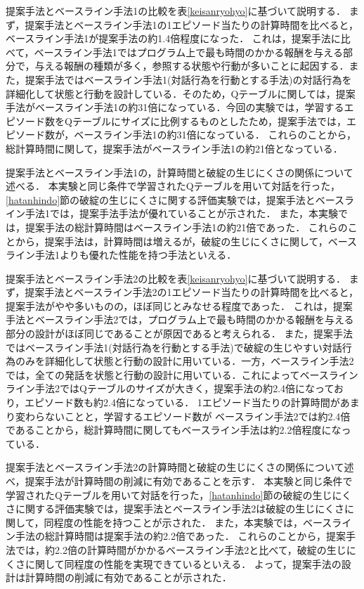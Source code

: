 \documentclass[12pt,a4paper,twoside,openany]{jbook}
\begin{document}
提案手法とベースライン手法1の比較を表\ref{keisanryohyo}に基づいて説明する．
まず，提案手法とベースライン手法1の1エピソード当たりの計算時間を比べると，ベースライン手法1が提案手法の約1.4倍程度になった．
これは，提案手法に比べて，ベースライン手法1ではプログラム上で最も時間のかかる報酬を与える部分で，与える報酬の種類が多く，参照する状態や行動が多いことに起因する．また，提案手法ではベースライン手法1(対話行為を行動とする手法)の対話行為を詳細化して状態と行動を設計している．そのため，Qテーブルに関しては，提案手法がベースライン手法1の約31倍になっている．今回の実験では，学習するエピソード数をQテーブルにサイズに比例するものとしたため，提案手法では，エピソード数が，ベースライン手法1の約31倍になっている．
これらのことから，総計算時間に関して，提案手法がベースライン手法1の約21倍となっている．

提案手法とベースライン手法1の，計算時間と破綻の生じにくさの関係について述べる．
本実験と同じ条件で学習されたQテーブルを用いて対話を行った，\ref{hatanhindo}節の破綻の生じにくさに関する評価実験では，提案手法とベースライン手法1では，提案手法手法が優れていることが示された．
また，本実験では，提案手法の総計算時間はベースライン手法1の約21倍であった．
これらのことから，提案手法は，計算時間は増えるが，破綻の生じにくさに関して，ベースライン手法1よりも優れた性能を持つ手法といえる．

提案手法とベースライン手法2の比較を表\ref{keisanryohyo}に基づいて説明する．
まず，提案手法とベースライン手法2の1エピソード当たりの計算時間を比べると，提案手法がやや多いものの，ほぼ同じとみなせる程度であった．
これは，提案手法とベースライン手法2では，プログラム上で最も時間のかかる報酬を与える部分の設計がほぼ同じであることが原因であると考えられる．
また，提案手法ではベースライン手法1(対話行為を行動とする手法)で破綻の生じやすい対話行為のみを詳細化して状態と行動の設計に用いている．一方，ベースライン手法2では，全ての発話を状態と行動の設計に用いている．これによってベースラインライン手法2ではQテーブルのサイズが大きく，提案手法の約2.4倍になっており，エピソード数も約2.4倍になっている．
1エピソード当たりの計算時間があまり変わらないことと，学習するエピソード数が
ベースライン手法2では約2.4倍であることから，総計算時間に関してもベースライン手法は約2.2倍程度になっている．

提案手法とベースライン手法2の計算時間と破綻の生じにくさの関係について述べ，提案手法が計算時間の削減に有効であることを示す．
本実験と同じ条件で学習されたQテーブルを用いて対話を行った，\ref{hatanhindo}節の破綻の生じにくさに関する評価実験では，提案手法とベースライン手法2は破綻の生じにくさに関して，同程度の性能を持つことが示された．
また，本実験では，ベースライン手法の総計算時間は提案手法の約2.2倍であった．
これらのことから，提案手法では，約2.2倍の計算時間がかかるベースライン手法2と比べて，破綻の生じにくさに関して同程度の性能を実現できているといえる．
よって，提案手法の設計は計算時間の削減に有効であることが示された．
\end{document}
